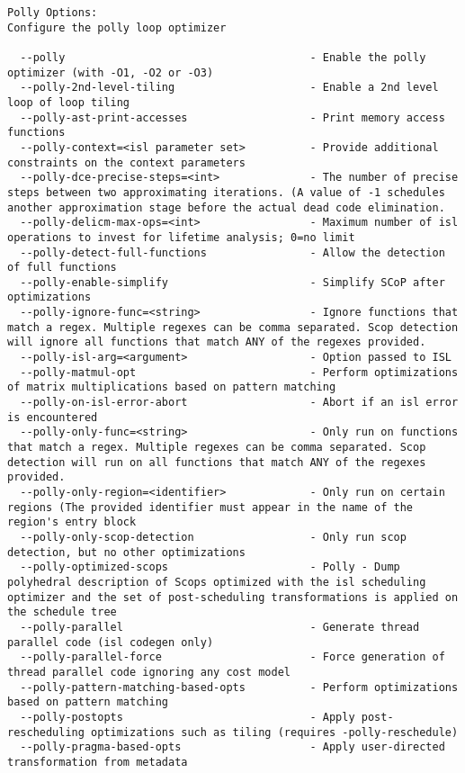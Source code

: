 \documentclass{studrep}
\begin{document}
\begin{verbatim}
Polly Options:
Configure the polly loop optimizer

  --polly                                      - Enable the polly optimizer (with -O1, -O2 or -O3)
  --polly-2nd-level-tiling                     - Enable a 2nd level loop of loop tiling
  --polly-ast-print-accesses                   - Print memory access functions
  --polly-context=<isl parameter set>          - Provide additional constraints on the context parameters
  --polly-dce-precise-steps=<int>              - The number of precise steps between two approximating iterations. (A value of -1 schedules another approximation stage before the actual dead code elimination.
  --polly-delicm-max-ops=<int>                 - Maximum number of isl operations to invest for lifetime analysis; 0=no limit
  --polly-detect-full-functions                - Allow the detection of full functions
  --polly-enable-simplify                      - Simplify SCoP after optimizations
  --polly-ignore-func=<string>                 - Ignore functions that match a regex. Multiple regexes can be comma separated. Scop detection will ignore all functions that match ANY of the regexes provided.
  --polly-isl-arg=<argument>                   - Option passed to ISL
  --polly-matmul-opt                           - Perform optimizations of matrix multiplications based on pattern matching
  --polly-on-isl-error-abort                   - Abort if an isl error is encountered
  --polly-only-func=<string>                   - Only run on functions that match a regex. Multiple regexes can be comma separated. Scop detection will run on all functions that match ANY of the regexes provided.
  --polly-only-region=<identifier>             - Only run on certain regions (The provided identifier must appear in the name of the region's entry block
  --polly-only-scop-detection                  - Only run scop detection, but no other optimizations
  --polly-optimized-scops                      - Polly - Dump polyhedral description of Scops optimized with the isl scheduling optimizer and the set of post-scheduling transformations is applied on the schedule tree
  --polly-parallel                             - Generate thread parallel code (isl codegen only)
  --polly-parallel-force                       - Force generation of thread parallel code ignoring any cost model
  --polly-pattern-matching-based-opts          - Perform optimizations based on pattern matching
  --polly-postopts                             - Apply post-rescheduling optimizations such as tiling (requires -polly-reschedule)
  --polly-pragma-based-opts                    - Apply user-directed transformation from metadata

\end{verbatim}
\end{document}
